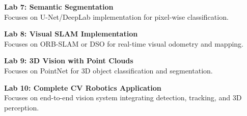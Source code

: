 \vspace{0.2cm}

\noindent\textbf{Lab 7: Semantic Segmentation} \\
Focuses on U-Net/DeepLab implementation for pixel-wise classification.

\vspace{0.2cm}

\noindent\textbf{Lab 8: Visual SLAM Implementation} \\
Focuses on ORB-SLAM or DSO for real-time visual odometry and mapping.

\vspace{0.2cm}

\noindent\textbf{Lab 9: 3D Vision with Point Clouds} \\
Focuses on PointNet for 3D object classification and segmentation.

\vspace{0.2cm}

\noindent\textbf{Lab 10: Complete CV Robotics Application} \\
Focuses on end-to-end vision system integrating detection, tracking, and 3D perception.

\vspace{0.2cm}

\newpage
{}
